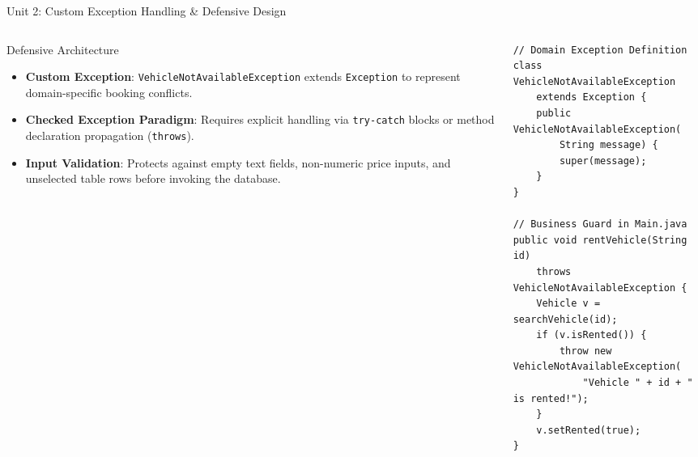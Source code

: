 \documentclass[aspectratio=169,10pt]{beamer}
\begin{document}
\begin{frame}[fragile]{Unit 2: Custom Exception Handling \& Defensive Design}
    \begin{columns}[T]
        \begin{column}{0.48\textwidth}
            \begin{block}{Defensive Architecture}
                \small
                \begin{itemize}
                    \item \textbf{Custom Exception}: \texttt{VehicleNotAvailableException} extends \texttt{Exception} to represent domain-specific booking conflicts.
                    \item \textbf{Checked Exception Paradigm}: Requires explicit handling via \texttt{try-catch} blocks or method declaration propagation (\texttt{throws}).
                    \item \textbf{Input Validation}: Protects against empty text fields, non-numeric price inputs, and unselected table rows before invoking the database.
                \end{itemize}
            \end{block}
        \end{column}
        
        \begin{column}{0.48\textwidth}
\begin{lstlisting}
// Domain Exception Definition
class VehicleNotAvailableException 
    extends Exception {
    public VehicleNotAvailableException(
        String message) {
        super(message);
    }
}

// Business Guard in Main.java
public void rentVehicle(String id) 
    throws VehicleNotAvailableException {
    Vehicle v = searchVehicle(id);
    if (v.isRented()) {
        throw new VehicleNotAvailableException(
            "Vehicle " + id + " is rented!");
    }
    v.setRented(true);
}
\end{lstlisting}
        \end{column}
    \end{columns}
\end{frame}
\end{document}
